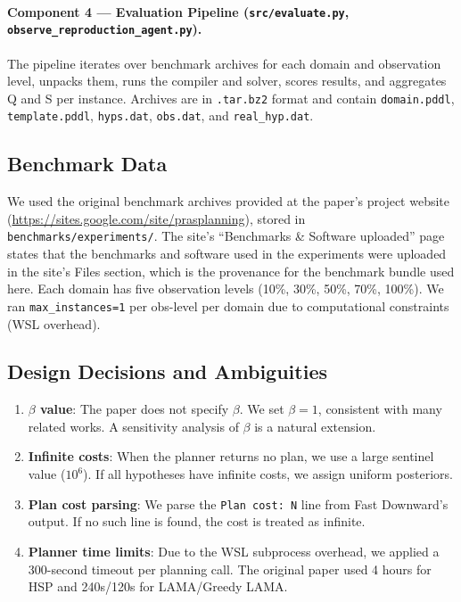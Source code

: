 \documentclass[10pt,twocolumn]{article}
\begin{document}
\paragraph{Component 4 — Evaluation Pipeline (\texttt{src/evaluate.py}, \texttt{observe\_reproduction\_agent.py}).}
The pipeline iterates over benchmark archives for each domain and observation level, unpacks them, runs the compiler and solver, scores results, and aggregates Q and S per instance. Archives are in \texttt{.tar.bz2} format and contain \texttt{domain.pddl}, \texttt{template.pddl}, \texttt{hyps.dat}, \texttt{obs.dat}, and \texttt{real\_hyp.dat}.

\subsection{Benchmark Data}

We used the original benchmark archives provided at the paper's project website (\url{https://sites.google.com/site/prasplanning}), stored in \texttt{benchmarks/experiments/}. The site's ``Benchmarks \& Software uploaded'' page states that the benchmarks and software used in the experiments were uploaded in the site's Files section, which is the provenance for the benchmark bundle used here. Each domain has five observation levels (10\%, 30\%, 50\%, 70\%, 100\%). We ran \texttt{max\_instances=1} per obs-level per domain due to computational constraints (WSL overhead).

\subsection{Design Decisions and Ambiguities}

\begin{enumerate}
  \item \textbf{$\beta$ value}: The paper does not specify $\beta$. We set $\beta = 1$, consistent with many related works. A sensitivity analysis of $\beta$ is a natural extension.
  \item \textbf{Infinite costs}: When the planner returns no plan, we use a large sentinel value ($10^6$). If all hypotheses have infinite costs, we assign uniform posteriors.
  \item \textbf{Plan cost parsing}: We parse the \texttt{Plan cost: N} line from Fast Downward's output. If no such line is found, the cost is treated as infinite.
  \item \textbf{Planner time limits}: Due to the WSL subprocess overhead, we applied a 300-second timeout per planning call. The original paper used 4 hours for HSP and 240s/120s for LAMA/Greedy LAMA.
\end{enumerate}
\end{document}
